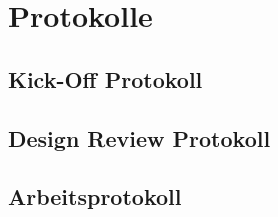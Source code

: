 \documentclass[
11pt, %
a4paper, %
BCOR10mm, %
DIV14, %
footsepline = false, %
headsepline, %
oneside, %
openright,
halfparskip, %
abstracton, %
listof=totocnumbered, %
bibliography=totocnumbered %
]{scrreprt}
\begin{document}
  
  
  \chapter{Protokolle}
  \section{Kick-Off Protokoll}
  \section{Design Review Protokoll}
  \section{Arbeitsprotokoll}
  
  \listoffigures
  \listoftables
  
  
  
\end{document}
